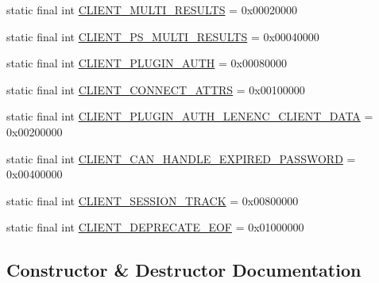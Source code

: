 \begin{DoxyCompactItemize}
\item 
static final int \mbox{\hyperlink{classcom_1_1mysql_1_1cj_1_1protocol_1_1a_1_1_native_server_session_a261fe8da7413e0ecf0d73774c7229495}{C\+L\+I\+E\+N\+T\+\_\+\+M\+U\+L\+T\+I\+\_\+\+R\+E\+S\+U\+L\+TS}} = 0x00020000
\item 
static final int \mbox{\hyperlink{classcom_1_1mysql_1_1cj_1_1protocol_1_1a_1_1_native_server_session_a46dcf545eb83128f94e3055b0cc53624}{C\+L\+I\+E\+N\+T\+\_\+\+P\+S\+\_\+\+M\+U\+L\+T\+I\+\_\+\+R\+E\+S\+U\+L\+TS}} = 0x00040000
\item 
static final int \mbox{\hyperlink{classcom_1_1mysql_1_1cj_1_1protocol_1_1a_1_1_native_server_session_a0f24415fd8bafd8f59855c8d7ba08b64}{C\+L\+I\+E\+N\+T\+\_\+\+P\+L\+U\+G\+I\+N\+\_\+\+A\+U\+TH}} = 0x00080000
\item 
static final int \mbox{\hyperlink{classcom_1_1mysql_1_1cj_1_1protocol_1_1a_1_1_native_server_session_a03ba55d0f657d3fdfd5fcb79083f9910}{C\+L\+I\+E\+N\+T\+\_\+\+C\+O\+N\+N\+E\+C\+T\+\_\+\+A\+T\+T\+RS}} = 0x00100000
\item 
static final int \mbox{\hyperlink{classcom_1_1mysql_1_1cj_1_1protocol_1_1a_1_1_native_server_session_a7e8d705e313e8c9e33cb7e60bc7288bc}{C\+L\+I\+E\+N\+T\+\_\+\+P\+L\+U\+G\+I\+N\+\_\+\+A\+U\+T\+H\+\_\+\+L\+E\+N\+E\+N\+C\+\_\+\+C\+L\+I\+E\+N\+T\+\_\+\+D\+A\+TA}} = 0x00200000
\item 
static final int \mbox{\hyperlink{classcom_1_1mysql_1_1cj_1_1protocol_1_1a_1_1_native_server_session_a46fc1bfca9cc318f57884258726bcf4c}{C\+L\+I\+E\+N\+T\+\_\+\+C\+A\+N\+\_\+\+H\+A\+N\+D\+L\+E\+\_\+\+E\+X\+P\+I\+R\+E\+D\+\_\+\+P\+A\+S\+S\+W\+O\+RD}} = 0x00400000
\item 
static final int \mbox{\hyperlink{classcom_1_1mysql_1_1cj_1_1protocol_1_1a_1_1_native_server_session_ae41eec1c6126a728c82a0bdc3a366b2b}{C\+L\+I\+E\+N\+T\+\_\+\+S\+E\+S\+S\+I\+O\+N\+\_\+\+T\+R\+A\+CK}} = 0x00800000
\item 
static final int \mbox{\hyperlink{classcom_1_1mysql_1_1cj_1_1protocol_1_1a_1_1_native_server_session_af4354f6755982c57f502489b585eacb4}{C\+L\+I\+E\+N\+T\+\_\+\+D\+E\+P\+R\+E\+C\+A\+T\+E\+\_\+\+E\+OF}} = 0x01000000
\end{DoxyCompactItemize}


\subsection{Constructor \& Destructor Documentation}
\mbox{\label{classcom_1_1mysql_1_1cj_1_1protocol_1_1a_1_1_native_server_session_a6c5791574148df51d2ad36e22d21b58c}} 
